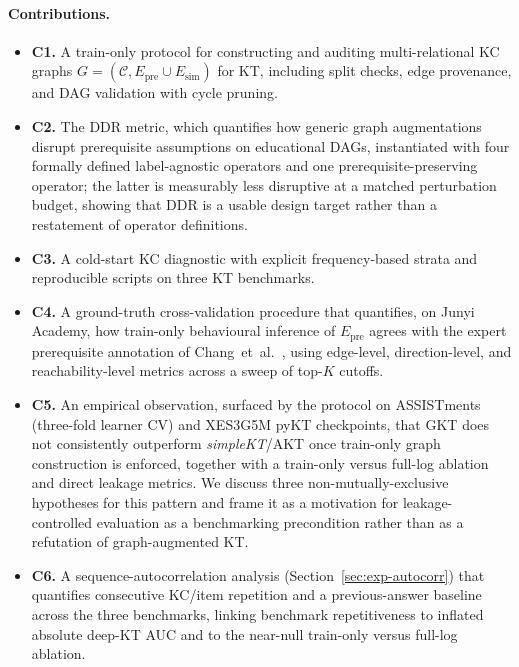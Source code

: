 \documentclass[pdflatex,sn-basic]{sn-jnl}
\newcommand{\Epre}{\ensuremath{E_{\text{pre}}}}
\newcommand{\Esim}{\ensuremath{E_{\text{sim}}}}
\newcommand{\DDR}{\textsc{DDR}}
\begin{document}
\paragraph{Contributions.}
\begin{itemize}
  \item \textbf{C1.} A train-only protocol for constructing and auditing
  multi-relational KC graphs
  $G=(\mathcal{C}, \Epre \cup \Esim)$ for KT, including split checks,
  edge provenance, and DAG validation with cycle pruning.
  \item \textbf{C2.} The \DDR{} metric, which quantifies how generic
  graph augmentations disrupt prerequisite assumptions on educational
  DAGs, instantiated with four formally defined label-agnostic operators
  and one prerequisite-preserving operator; the latter is measurably less
  disruptive at a matched perturbation budget, showing that \DDR{} is a
  usable design target rather than a restatement of operator definitions.
  \item \textbf{C3.} A cold-start KC diagnostic with explicit
  frequency-based strata and reproducible scripts on three KT
  benchmarks.
  \item \textbf{C4.} A ground-truth cross-validation procedure that
  quantifies, on Junyi Academy, how train-only behavioural inference of
  $\Epre$ agrees with the expert prerequisite annotation of
  Chang~et~al.~\cite{junyi_dataset}, using edge-level, direction-level,
  and reachability-level metrics across a sweep of top-$K$ cutoffs.
  \item \textbf{C5.} An empirical observation, surfaced by the protocol
  on ASSISTments (three-fold learner CV) and XES3G5M pyKT checkpoints, that GKT does not
  consistently outperform \textit{simpleKT}/AKT once train-only graph
  construction is enforced, together with a train-only versus full-log
  ablation and direct leakage metrics. We discuss three
  non-mutually-exclusive hypotheses for this pattern and frame it as a
  motivation for leakage-controlled evaluation as a benchmarking
  precondition rather than as a refutation of graph-augmented KT.
  \item \textbf{C6.} A sequence-autocorrelation analysis
  (Section~\ref{sec:exp-autocorr}) that quantifies consecutive KC/item
  repetition and a previous-answer baseline across the three benchmarks,
  linking benchmark repetitiveness to inflated absolute deep-KT AUC and
  to the near-null train-only versus full-log ablation.
\end{itemize}
\end{document}
